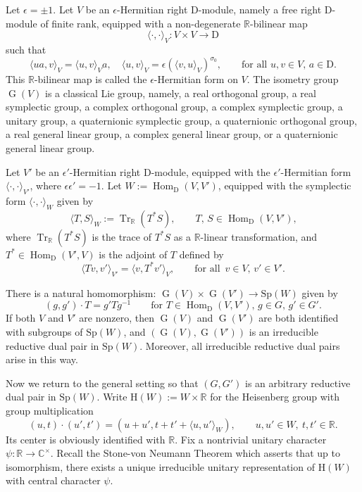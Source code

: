 \documentclass[lang = american]{ems-icm} %
\newcommand{\R}{\mathbb R}
\newcommand{\la}{\langle}
\newcommand{\ra}{\rangle}
\def\Sp{{\mathrm{Sp}}}
\newcommand{\Hom}{\operatorname{Hom}}
\newcommand{\Tr}{\operatorname{Tr}}
\newcommand{\rD}{\mathrm D}
\newcommand{\oG}{\operatorname{G}}
\numberwithin{equation}{section}
\theoremstyle{remark}
\begin{document}
Let $\epsilon=\pm 1$. Let $V$ be an $\epsilon$-Hermitian right $\rD$-module, namely a free right $\rD$-module of finite rank,  equipped with a non-degenerate $\R$-bilinear map
\[
\langle\cdot , \cdot  \rangle_{V}: V\times V\rightarrow \rD
\]
such that
\[
  \langle u a, v\rangle_V=\langle u,v\rangle_V a, \quad \langle u,v\rangle_V=\epsilon (\langle v,u\rangle_V)^{\sigma_0}, \qquad \textrm{for all }u,v\in V, \, a\in \rD.
\]
This $\R$-bilinear map is called the $\epsilon$-Hermitian form on $V$.
The isometry group $\oG(V)$ is a  classical Lie group, namely, a real orthogonal group, a real symplectic group, a complex orthogonal group, a complex symplectic group, a unitary group, a quaternionic symplectic group, a quaternionic orthogonal group, a real general linear group, a complex general linear group, or a quaternionic general linear group.


Let $V'$ be an $\epsilon'$-Hermitian right $\rD$-module, equipped with the $\epsilon'$-Hermitian form
$\langle \cdot , \cdot  \rangle_{V'}$, where $\epsilon \epsilon '=-1$. %
Let $W:=\Hom_{\rD}(V,V')$, equipped with the symplectic form $\langle\cdot , \cdot  \rangle _W$ given by
\[
\la T, S\ra_{W}:=\Tr_{\R} (T^{\ast}S), \qquad \mbox{$T$, $S\in \Hom_{\rD}(V,V')$,}
\]
where $\Tr_{\R} (T^{\ast}S)$ is the trace of $T^{\ast}S$ as a $\R$-linear transformation, and $T^{\ast}\in \Hom_{\rD}(V',V)$ is the adjoint of $T$ defined by
\begin{equation}\label{adj}
\langle Tv,v'\rangle_{V'}=\langle v,T^{\ast}v'\rangle_{V}, \qquad \mbox{for all $\, v\in V$, $v'\in V'$.}
\end{equation}


There is a natural homomorphism: $\oG(V) \times \oG(V')\longrightarrow \Sp(W)$ given by
\[
 (g,g')\cdot T = g' T g^{-1} \qquad \mbox{for $T \in \Hom_{\rD}(V,{V}')$, $g\in G$, $g'\in G'$}.
\]
If both $V$ and $V'$ are nonzero, then $\oG(V)$ and $\oG(V')$ are both identified with subgroups of $\Sp(W)$, and $(\oG(V),\oG(V'))$ is an irreducible reductive dual pair in $\Sp(W)$. Moreover, all irreducible reductive dual pairs arise in this way.



Now we return to the general setting so that $(G,G')$ is an arbitrary reductive dual pair in $\Sp(W)$.
Write  $\mathrm{H}(W):=W\times \R$ for  the Heisenberg group with group multiplication
\[
  (u,t)\cdot (u',t')=(u+u', t+t'+\langle u, u'\rangle_W), \qquad u,u'\in W, \ t, t'\in \R.
\]
Its center is obviously identified with $\R$.
Fix a nontrivial unitary character $\psi: \R\rightarrow \mathbb C^\times$. Recall the Stone-von
Neumann Theorem which asserts that up to isomorphism, there exists a unique irreducible
unitary representation of
$\mathrm H(W)$ with central character $\psi$.
\end{document}
